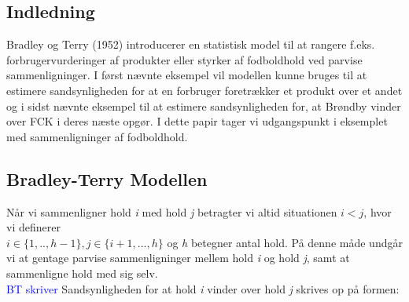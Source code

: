 \documentclass[11pt,a4paper]{article}
\begin{document}
\subsection{Indledning}
Bradley og Terry (1952) introducerer en statistisk model til at rangere f.eks. forbrugervurderinger af produkter eller styrker af fodboldhold ved parvise sammenligninger. I først nævnte eksempel vil modellen kunne bruges til at estimere sandsynligheden for at en forbruger foretrækker et produkt over et andet og i sidst nævnte eksempel til at estimere sandsynligheden for, at Brøndby vinder over FCK i deres næste opgør. I dette papir tager vi udgangspunkt i eksemplet med sammenligninger af fodboldhold. 

\subsection{Bradley-Terry Modellen}
Når vi sammenligner hold \textit{i} med hold \textit{j} betragter vi altid situationen $i<j$, hvor vi definerer \\$i \in \{1,..,h-1\}, j\in \{i+1,...,h\}$ og \textit{h} betegner antal hold. På denne måde undgår vi at gentage parvise sammenligninger mellem hold \textit{i} og hold \textit{j}, samt at sammenligne hold med sig selv.\\
\textcolor{blue}{BT skriver} Sandsynligheden for at hold \textit{i} vinder over hold \textit{j} skrives op på formen:
\end{document}
